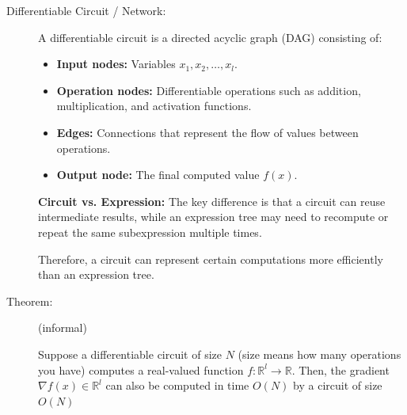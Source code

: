 \documentclass[12pt,a4paper]{report}
\begin{document}
\begin{description}
    \item[Differentiable Circuit / Network:]
    A differentiable circuit is a directed acyclic graph (DAG)
    consisting of:
    \begin{itemize}
        \item \textbf{Input nodes:} Variables $x_1, x_2, \ldots, x_l$.
        \item \textbf{Operation nodes:} Differentiable operations
        such as addition, multiplication, and activation functions.
        \item \textbf{Edges:} Connections that represent the flow
        of values between operations.
        \item \textbf{Output node:} The final computed value $f(x)$.
    \end{itemize}

    \textbf{Circuit vs. Expression:}
    The key difference is that a circuit can reuse intermediate
    results, while an expression tree may need to recompute
    or repeat the same subexpression multiple times.

    Therefore, a circuit can represent certain computations
    more efficiently than an expression tree.
\end{description}


\begin{description}
    \item[Theorem: ] (informal)

        Suppose a differentiable circuit of size $N$ (size means how many operations you have) computes a real-valued function  $f: \mathbb{R}^l \rightarrow \mathbb{R}$. Then, the gradient $\nabla f(x) \in \mathbb{R}^l$ can also be computed in time $O(N)$ by a circuit of size $O(N)$
\end{description}
\end{document}
